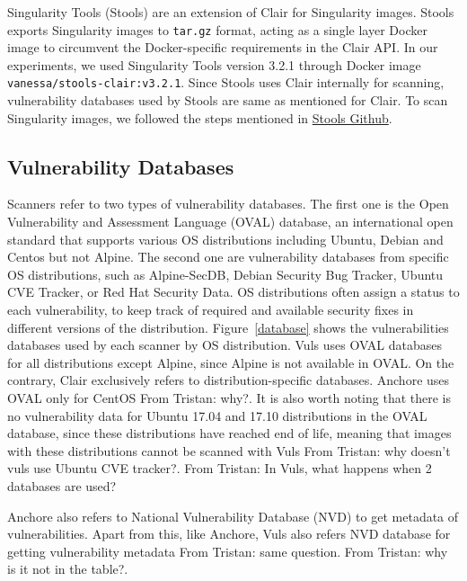 \documentclass[a4paper,num-refs]{oup-contemporary}
\newcommand{\tristan}[1]{\color{blue}From Tristan: #1\color{black}}
\begin{document}
Singularity Tools (Stools)
are an extension of Clair for Singularity images. Stools
exports Singularity images to \texttt{tar.gz} format, acting as a single layer Docker image
to circumvent the Docker-specific requirements in the Clair API.
In our experiments, we used Singularity Tools version 3.2.1 through Docker
image
\texttt{vanessa/stools-clair:v3.2.1}.
Since Stools uses Clair internally for scanning, vulnerability databases used
by Stools are same as mentioned for Clair.
To scan Singularity images, we followed the steps mentioned in
\href{https://github.com/singularityhub/stools}{Stools Github}.

\subsection{Vulnerability Databases}

Scanners refer to two types of vulnerability databases. The first one is
the Open Vulnerability and Assessment Language (OVAL) database, an
international open standard that supports various OS distributions
including Ubuntu, Debian and Centos but not Alpine. The second one are vulnerability
databases from specific OS distributions, such as Alpine-SecDB, Debian
Security Bug Tracker, Ubuntu CVE Tracker, or Red Hat Security Data. OS
distributions often assign a status to each vulnerability, to keep track of
required and available security fixes in different versions of the
distribution. Figure~\ref{database} shows the vulnerabilities databases used by each scanner 
by OS distribution. Vuls uses OVAL databases for all distributions except Alpine, since Alpine is not available in OVAL. On the contrary, 
Clair exclusively refers to distribution-specific databases. Anchore uses OVAL only for CentOS \tristan{why?}. It is also worth noting that there is
no vulnerability data for Ubuntu 17.04 and 17.10 distributions in the OVAL database, since these distributions have reached end of life, meaning that images
with these distributions cannot be scanned with Vuls \tristan{why doesn't vuls use Ubuntu CVE tracker?}.
\tristan{In Vuls, what happens when 2 databases are used?}

Anchore also refers to National Vulnerability Database (NVD) to get
metadata of vulnerabilities. Apart from this, like Anchore, Vuls also
refers NVD database for getting vulnerability metadata \tristan{same
question}. \tristan{why is it not in the table?}.
\end{document}
